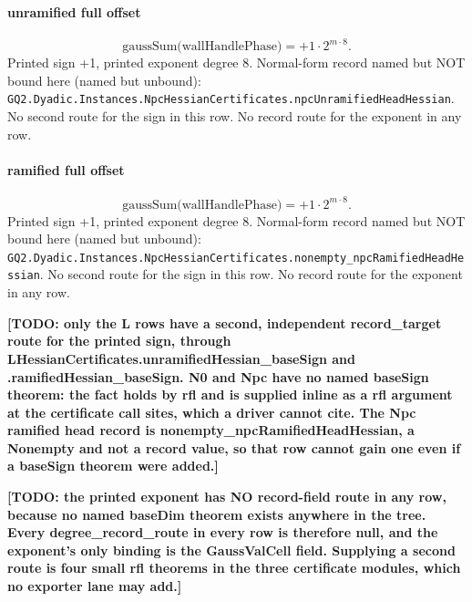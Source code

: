 \paragraph{unramified full offset}
\[\mathrm{gaussSum}\bigl(\mathrm{wallHandlePhase}\bigr)=+1\cdot 2^{m\cdot 8}.\]
Printed sign +1, printed exponent degree 8. Normal-form record named but NOT bound here (named but unbound): \texttt{GQ2.Dyadic.Instances.NpcHessianCertificates.npcUnramifiedHeadHessian}.
No second route for the sign in this row. No record route for the exponent in any row.
\paragraph{ramified full offset}
\[\mathrm{gaussSum}\bigl(\mathrm{wallHandlePhase}\bigr)=+1\cdot 2^{m\cdot 8}.\]
Printed sign +1, printed exponent degree 8. Normal-form record named but NOT bound here (named but unbound): \texttt{GQ2.Dyadic.Instances.NpcHessianCertificates.nonempty\_npcRamifiedHeadHessian}.
No second route for the sign in this row. No record route for the exponent in any row.
\par\noindent\textbf{[TODO: only the L rows have a second, independent record\_target route for the printed sign, through LHessianCertificates.unramifiedHessian\_baseSign and .ramifiedHessian\_baseSign. N0 and Npc have no named baseSign theorem: the fact holds by rfl and is supplied inline as a rfl argument at the certificate call sites, which a driver cannot cite. The Npc ramified head record is nonempty\_npcRamifiedHeadHessian, a Nonempty and not a record value, so that row cannot gain one even if a baseSign theorem were added.]}
\par\noindent\textbf{[TODO: the printed exponent has NO record-field route in any row, because no named baseDim theorem exists anywhere in the tree. Every degree\_record\_route in every row is therefore null, and the exponent's only binding is the GaussValCell field. Supplying a second route is four small rfl theorems in the three certificate modules, which no exporter lane may add.]}

